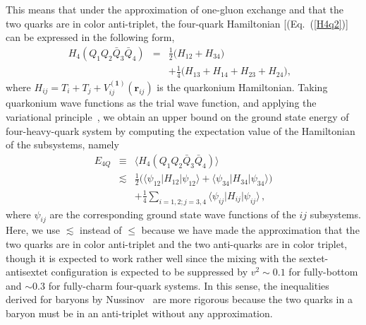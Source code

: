 \documentclass[twocolumn,showpacs,superscriptaddress,preprintnumbers,nofootinbib,prd]{revtex4-1}
\begin{document}
This means that under the approximation of one-gluon exchange and that the two
quarks are in color anti-triplet, the four-quark Hamiltonian [(Eq.~(\ref{H4q2})] can
be
expressed in the following form,
\begin{eqnarray}
H_{4}(Q_1 Q_2 \bar{Q}_3\bar{Q}_4) &=& \frac{1}{2} \Big( H_{12} + H_{34} \Big) \nonumber\\
&& +
\frac{1}{4} \Big( H_{13} + H_{14} + H_{23}  + H_{24} \Big),~~~
\end{eqnarray}
where $H_{ij}= T_i + T_j + V_{ij}^{(\textbf{1})} (\textbf{r}_{ij})$ is the
quarkonium Hamiltonian. Taking quarkonium wave functions as the trial wave
function, and applying the variational principle~\cite{Nussinov:1983vh},
we obtain an upper bound on the ground state energy of four-heavy-quark
system
by computing the expectation value of the Hamiltonian of the subsystems, namely
\begin{eqnarray}
E_{4Q} &\equiv&  \big\langle H_{4}(Q_1 Q_2 \bar{Q}_3\bar{Q}_4) \big\rangle \nonumber\\
&\lesssim &
\frac12\Big(\big\langle \psi_{12} \big| H_{12} \big|\psi_{12} \big\rangle +
\big\langle \psi_{34} \big| H_{34} \big| \psi_{34} \big\rangle\Big) \nonumber\\
&& + \frac14
\sum_{i=1,2;j=3,4} \big\langle \psi_{ij} \big| H_{ij} \big| \psi_{ij} \big\rangle \,,
\label{E4Q}
\end{eqnarray}
where $\psi_{ij}$ are the corresponding ground state wave functions of the $ij$
subsystems. Here, we use $\lesssim$ instead of $\leq$ because we have made the approximation that the two quarks are in color anti-triplet and the two anti-quarks are in color triplet, though it is expected to work rather well since the mixing with the sextet-antisextet configuration is expected to be suppressed by $v^2\sim0.1$ for fully-bottom and $\sim0.3$ for fully-charm four-quark systems. In this sense, the inequalities derived for baryons by Nussinov~\cite{Nussinov:1983vh} are more rigorous because the two quarks in a baryon must be in an anti-triplet without any approximation.
\end{document}
